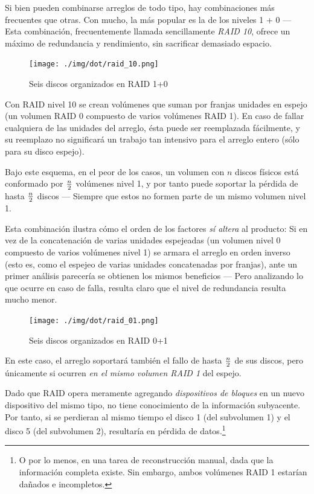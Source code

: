 \documentclass[11pt,fleqn]{book} %
\begin{document}
Si bien pueden combinarse arreglos de todo tipo, hay combinaciones más
frecuentes que otras. Con mucho, la más popular es la de los niveles
1 + 0 — Esta combinación, frecuentemente llamada sencillamente \emph{RAID 10}, ofrece un máximo de redundancia y rendimiento, sin sacrificar
demasiado espacio.

\begin{figure}[htb]
\centering
\texttt{[image: ./img/dot/raid\_10.png]}
\caption{\label{FS_FIS_raid_10}Seis discos organizados en RAID 1+0}
\end{figure}

Con RAID nivel 10 se crean volúmenes que suman por franjas unidades en
espejo (un volumen RAID 0 compuesto de varios volúmenes RAID 1). En
caso de fallar cualquiera de las unidades del arreglo, ésta puede ser
reemplazada fácilmente, y su reemplazo no significará un trabajo tan
intensivo para el arreglo entero (sólo para su disco espejo).

Bajo este esquema, en el peor de los casos, un volumen con $n$
discos físicos está conformado por $n \over 2$ volúmenes nivel 1, y por tanto
puede soportar la pérdida de hasta $n \over 2$ discos — Siempre
que estos no formen parte de un mismo volumen nivel 1.

Esta combinación ilustra cómo el orden de los
factores \emph{sí altera} al producto: Si en vez de la concatenación de
varias unidades espejeadas (un volumen nivel 0 compuesto de varios
volúmenes nivel 1) se armara el arreglo en orden inverso (esto
es, como el espejeo de varias unidades concatenadas por franjas),
ante un primer análisis parecería se obtienen los mismos beneficios —
Pero analizando lo que ocurre en caso de falla, resulta claro que el
nivel de redundancia resulta mucho menor.

\begin{figure}[htb]
\centering
\texttt{[image: ./img/dot/raid\_01.png]}
\caption{\label{FS_FIS_raid_01}Seis discos organizados en RAID 0+1}
\end{figure}

En este caso, el arreglo soportará también el fallo de hasta $n \over
2$ de sus discos, pero únicamente si ocurren \emph{en el mismo volumen RAID 1} del espejo.

Dado que RAID opera meramente agregando \emph{dispositivos de bloques} en
un nuevo dispositivo del mismo tipo, no tiene conocimiento de la
información subyacente. Por tanto, si se perdieran al mismo tiempo el
disco 1 (del subvolumen 1) y el disco 5 (del subvolumen 2), resultaría
en pérdida de datos.\footnote{O por lo menos, en una tarea de
reconstrucción manual, dada que la información completa existe. Sin
embargo, ambos volúmenes RAID 1 estarían dañados e incompletos. }
\end{document}
